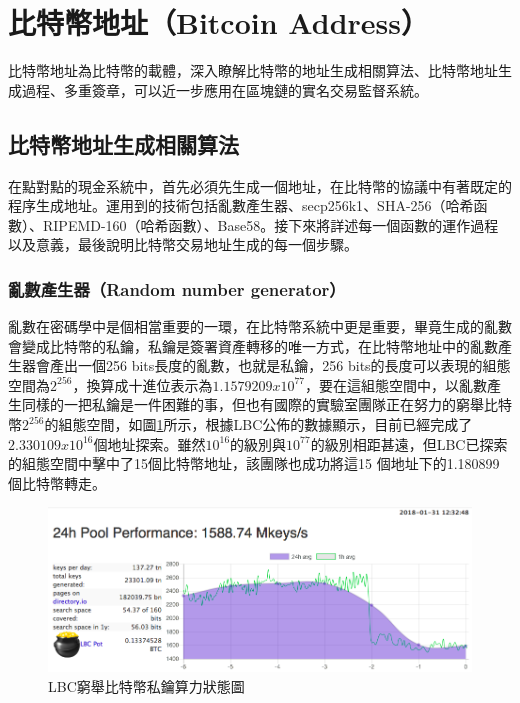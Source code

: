 		\section{比特幣地址（Bitcoin Address）}
		⽐特幣地址為⽐特幣的載體，深⼊瞭解⽐特幣的地址⽣成相關算法、⽐特幣地址⽣成過程、多重簽章，可以近⼀步應⽤在區塊鏈的實名交易監督系統。

			\subsection{比特幣地址生成相關算法}
			在點對點的現金系統中，首先必須先生成一個地址，在比特幣的協議中有著既定的程序生成地址。運用到的技術包括亂數產生器、secp256k1\supercite{johnson2001elliptic}、SHA-256（哈希函數）\supercite{DBLP:conf/fse/KhovratovichRS12}、RIPEMD-160（哈希函數）\supercite{DBLP:conf/isw/MendelPRR06}、Base58\supercite{Base58}。接下來將詳述每一個函數的運作過程以及意義，最後說明比特幣交易地址生成的每一個步驟。
			
				\subsubsection{亂數產生器（Random number generator）}
				亂數在密碼學中是個相當重要的一環，在比特幣系統中更是重要，畢竟生成的亂數會變成比特幣的私鑰，私鑰是簽署資產轉移的唯一方式，在比特幣地址中的亂數產生器會產出一個256 bits長度的亂數，也就是私鑰，256 bits的長度可以表現的組態空間為$2^{256}$，換算成十進位表示為$1.1579209x10^{77}$，要在這組態空間中，以亂數產生同樣的一把私鑰是一件困難的事，但也有國際的實驗室\supercite{TheLargeBitcoinCollider}團隊正在努力的窮舉比特幣$2^{256}$的組態空間，如圖\ref{LBC}所示，根據LBC公佈的數據顯示，目前已經完成了$2.330109x10^{16}$個地址探索。雖然$10^{16}$的級別與$10^{77}$的級別相距甚遠，但LBC已探索的組態空間中擊中了15個比特幣地址，該團隊也成功將這15 個地址下的1.180899個比特幣轉走。

				\begin{figure}[htbp]
					\centering
					\includegraphics[width = .9\textwidth]{LBC.png}
					\caption{LBC窮舉比特幣私鑰算力狀態圖\supercite{TheLargeBitcoinCollider}}\label{LBC}
				\end{figure}

